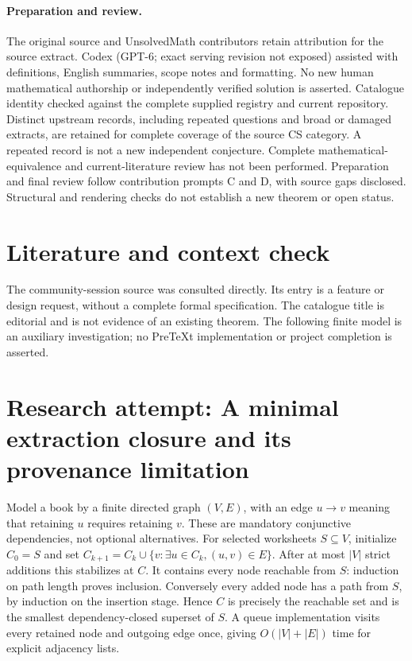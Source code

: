\documentclass[11pt]{article}
\begin{document}
\paragraph{Preparation and review.}
The original source and UnsolvedMath contributors retain attribution for the source extract. Codex (GPT-6; exact serving revision not exposed) assisted with definitions, English summaries, scope notes and formatting. No new human mathematical authorship or independently verified solution is asserted. Catalogue identity checked against the complete supplied registry and current repository. Distinct upstream records, including repeated questions and broad or damaged extracts, are retained for complete coverage of the source CS category. A repeated record is not a new independent conjecture. Complete mathematical-equivalence and current-literature review has not been performed. Preparation and final review follow contribution prompts C and D, with source gaps disclosed. Structural and rendering checks do not establish a new theorem or open status.
\label{end:statement}

\section{Literature and context check}
The community-session source was consulted directly. Its entry is a feature or design request, without a complete formal specification. The catalogue title is editorial and is not evidence of an existing theorem. The following finite model is an auxiliary investigation; no PreTeXt implementation or project completion is asserted.
\section{Research attempt: A minimal extraction closure and its provenance limitation}
Model a book by a finite directed graph $(V,E)$, with an edge $u\to v$ meaning that retaining $u$ requires retaining $v$. These are mandatory conjunctive dependencies, not optional alternatives. For selected worksheets $S\subseteq V$, initialize $C_0=S$ and set $C_{k+1}=C_k\cup\{v:\exists u\in C_k,(u,v)\in E\}$. After at most $|V|$ strict additions this stabilizes at $C$. It contains every node reachable from $S$: induction on path length proves inclusion. Conversely every added node has a path from $S$, by induction on the insertion stage. Hence $C$ is precisely the reachable set and is the smallest dependency-closed superset of $S$. A queue implementation visits every retained node and outgoing edge once, giving $O(|V|+|E|)$ time for explicit adjacency lists.
\end{document}
